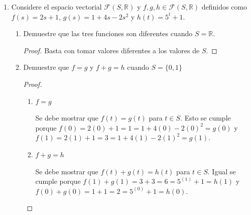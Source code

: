 \documentclass[11pt,letterpaper]{article}
\newcommand{\R}{\mathbb{R}}
\newcommand{\verd}{\textbf{\underline{Verdadero} }}
\begin{document}
\begin{enumerate}
¿Qué se puede decir del conjunto de las funciones impares, forman o no un espacio vectorial? Justifique su respuesta.

\verd Sí forman un espacio vectorial, denotando así
\[
    \mathscr{E}'(\R, \R) = \{ f: \R \to \R \  \mid \  f(-x) = -f(x), \forall x \in \R \}
\]
\begin{proof}
    Sea $\mathscr{E}' \subset V$ donde $V$ está definido como el espacio vectorial de todos los funciones
    evaluadas en valores reales en la línea real. Como $V$ es un espacio vectorial basta con probar que
    $\mathscr{E}'$ es un subespacio de $V$.
    
    La función $0$ es impar, $0_V(-x) = -0_V(x)$ para todo $x \in \R$. Ahora sea $c \in \R$ y $f, g
    \in \mathscr{E}'$ entonces $(cf+g)(-x) = cf(-x) + g(-x) = -cf(x) - g(x) = -(cf+g)(x)$
    y por tanto $cf + g \in \mathscr{E}'$. Como $\mathscr{E}'$ es
    un subespacio de sigue que es un espacio vectorial.
\end{proof}

\item Considere el espacio vectorial $\mathscr{F}(S,\R)$ y $f,g,h \in \mathscr{F}(S,\R)$ definidos como
$f(s)=2s+1$, $g(s)=1+4s-2s^2$ y $h(t)=5^t+1$.
\begin{enumerate}[label=(\alph*)]
    \item Demuestre que las tres funciones son diferentes cuando $S = \R$.
    \begin{proof}
        Basta con tomar valores diferentes a los valores de $S$.
    \end{proof}

    \item Demuestre que $f=g$ y $f+g=h$ cuando $S=\{0,1\}$
    \begin{proof}
        \begin{enumerate}
            \item $f = g$

            Se debe mostrar que $f(t) = g(t)$ para $t \in S$. Esto se cumple porque 
            $f(0) = 2(0)+1 = 1 = 1 + 4(0) - 2(0)^2 = g(0)$ y
            $f(1) = 2(1)+1 = 3 = 1 + 4(1) - 2(1)^2 = g(1)$.

            \item $f + g = h$

            Se debe mostrar que $f(t) + g(t) = h(t)$ para $t \in S$. Igual se cumple porque
            $f(1) + g(1) = 3 + 3 = 6 = 5^{(1)} + 1 = h(1)$ y
            $f(0) + g(0) = 1 + 1 = 2 = 5^{(0)} + 1 = h(0)$.
        \end{enumerate}
    \end{proof}
\end{enumerate}


\end{enumerate}
\end{document}
